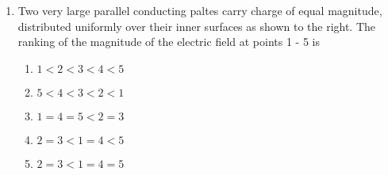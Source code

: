 \documentclass[10pt]{article}
\begin{document}
\begin{enumerate}[resume, itemsep = 5mm]
  \item Two very large parallel conducting paltes carry charge of
    equal magnitude, distributed uniformly over their inner surfaces
    as shown to the right.  The ranking of the magnitude of the
    electric field at points 1 - 5 is
    \begin{enumerate}
      \item $1 < 2 < 3 < 4 < 5$
      \item $5 < 4 < 3 < 2 < 1$
      \item $1 = 4 = 5 < 2 = 3$
      \item $2 = 3 < 1 = 4 < 5$
      \item $2 = 3 < 1 = 4 = 5$
    \end{enumerate}

\end{enumerate}
\end{document}
